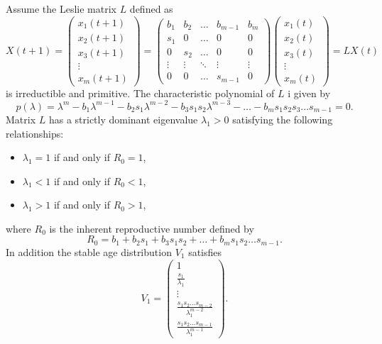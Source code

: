 \begin{theorem}
Assume the Leslie matrix $L$ defined as
$$X(t+1)=\left (
\begin{array}{c}
x_1(t+1)\\
x_2(t+1)\\
x_3(t+1)\\
\vdots\\
x_m(t+1)
\end{array}
\right )
=
\left(
\begin{array}{ccccc}
b_1 & b_2 & \hdots & b_{m-1} & b_m\\
s_1 & 0  & \hdots & 0 & 0\\
0 & s_2  & \hdots & 0 & 0\\
\vdots & \vdots & \ddots & \vdots & \vdots \\
0 &0 &\hdots & s_{m-1} &0
\end{array}
\right)
\left (
\begin{array}{c}
x_1(t)\\
x_2(t)\\
x_3(t)\\
\vdots\\
x_m(t)
\end{array}
\right )=LX(t)
$$
is irreductible and primitive. The characteristic polynomial of $L$ i given by
$$p(\lambda)=\lambda ^m-b_1 \lambda^{m-1}-b_2s_1 \lambda^{m-2}- b_3s_1 s_2 \lambda^{m-3}-\dots - b_m s_1s_2 s_3\dots s_{m-1}=0 .$$
Matrix $L$ has a strictly dominant eigenvalue $\lambda _1>0$ satisfying the following relationships:
\begin{itemize}
\item $\lambda _1 =1$ if and only if $R_0=1$,
\item $\lambda _1 <1$ if and only if $R_0<1$,
\item $\lambda _1 >1$ if and only if $R_0>1$,
\end{itemize}
where $R_0$ is the inherent reproductive number defined by
$$R_0=b_1+b_2s_1+b_3s_1s_2+\dots+b_ms_1s_2\dots s_{m-1}.$$
In addition the stable age distribution $V_1$ satisfies
$$V_1=\left (\begin{array}{c}
1\\
\frac{s_1}{\lambda _1}\\
\vdots\\
\frac{s_1s_2\dots s_{m-2}}{\lambda_1^{m-2}}\\
\frac{s_1s_2\dots s_{m-1}}{\lambda_1^{m-1}}
\end{array}\right ).
$$
\end{theorem}

